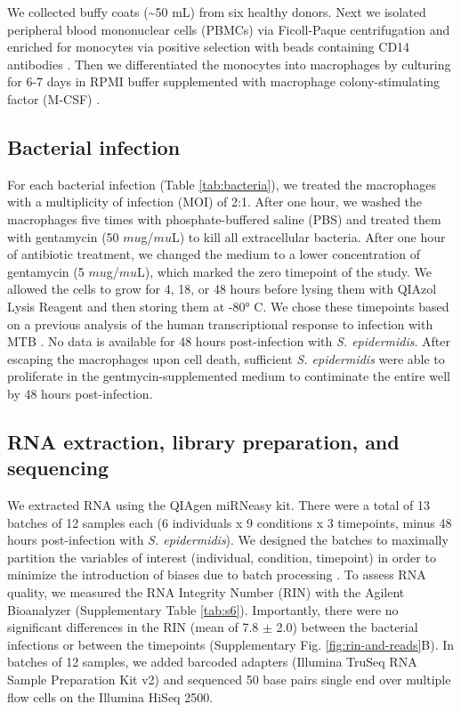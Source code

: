 We collected buffy coats (\textasciitilde{}50 mL) from six healthy
donors. Next we isolated peripheral blood mononuclear cells (PBMCs) via
Ficoll-Paque centrifugation \citep{Rivero-Lezcano2012} and enriched for
monocytes via positive selection with beads containing CD14 antibodies
\citep{Barreiro2012}. Then we differentiated the monocytes into
macrophages by culturing for 6-7 days in RPMI buffer supplemented with
macrophage colony-stimulating factor (M-CSF) \citep{Tailleux2003}.

\subsection{Bacterial infection}\label{bacterial-infection}

For each bacterial infection (Table \ref{tab:bacteria}), we treated the macrophages with
a multiplicity of infection (MOI) of 2:1. After one hour, we washed the
macrophages five times with phosphate-buffered saline (PBS) and treated
them with gentamycin (50 $mu$g/$mu$L) to kill all extracellular bacteria.
After one hour of antibiotic treatment, we changed the medium to a lower
concentration of gentamycin (5 $mu$g/$mu$L), which marked the zero timepoint
of the study. We allowed the cells to grow for 4, 18, or 48 hours before
lysing them with QIAzol Lysis Reagent and then storing them at -80° C.
We chose these timepoints based on a previous analysis of the human
transcriptional response to infection with MTB \citep{Tailleux2008}. No
data is available for 48 hours post-infection with \emph{S.
epidermidis}. After escaping the macrophages upon cell death, sufficient
\emph{S. epidermidis} were able to proliferate in the
gentmycin-supplemented medium to contiminate the entire well by 48 hours
post-infection.

\subsection{RNA extraction, library preparation, and
sequencing}\label{rna-extraction-library-preparation-and-sequencing}

We extracted RNA using the QIAgen miRNeasy kit. There were a total of 13
batches of 12 samples each (6 individuals x 9 conditions x 3 timepoints,
minus 48 hours post-infection with \emph{S. epidermidis}). We designed
the batches to maximally partition the variables of interest
(individual, condition, timepoint) in order to minimize the introduction
of biases due to batch processing \citep{Auer2010}. To assess RNA
quality, we measured the RNA Integrity Number (RIN) with the Agilent
Bioanalyzer (Supplementary Table \ref{tab:s6}). Importantly, there were no
significant differences in the RIN (mean of 7.8 $\pm$ 2.0) between the
bacterial infections or between the timepoints (Supplementary Fig. \ref{fig:rin-and-reads}B). In batches of 12 samples, we added barcoded adapters (Illumina
TruSeq RNA Sample Preparation Kit v2) and sequenced 50 base pairs single
end over multiple flow cells on the Illumina HiSeq 2500.

